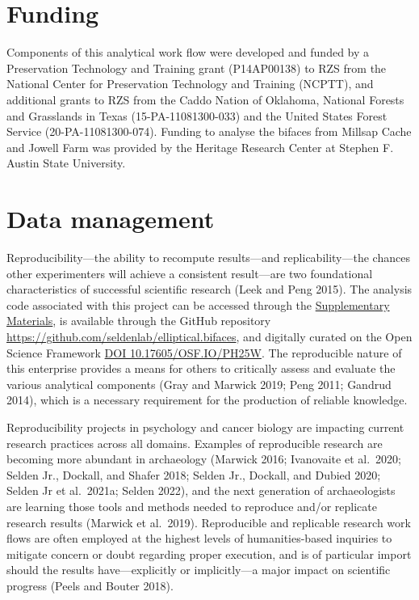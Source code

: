 \documentclass[]{interact}
\theoremstyle{plain}%
\theoremstyle{definition}
\theoremstyle{remark}
\begin{document}
\hypertarget{funding}{%
\section*{Funding}\label{funding}}

Components of this analytical work flow were developed and funded by a
Preservation Technology and Training grant (P14AP00138) to RZS from the
National Center for Preservation Technology and Training (NCPTT), and
additional grants to RZS from the Caddo Nation of Oklahoma, National
Forests and Grasslands in Texas (15-PA-11081300-033) and the United
States Forest Service (20-PA-11081300-074). Funding to analyse the
bifaces from Millsap Cache and Jowell Farm was provided by the Heritage
Research Center at Stephen F. Austin State University.

\hypertarget{data-management}{%
\section{Data management}\label{data-management}}

Reproducibility---the ability to recompute results---and
replicability---the chances other experimenters will achieve a
consistent result---are two foundational characteristics of successful
scientific research (Leek and Peng 2015). The analysis code associated
with this project can be accessed through the
\href{https://seldenlab.github.io/elliptical.bifaces/}{Supplementary
Materials}, is available through the GitHub repository
\url{https://github.com/seldenlab/elliptical.bifaces}, and digitally
curated on the Open Science Framework \href{https://osf.io/ph25w/}{DOI
10.17605/OSF.IO/PH25W}. The reproducible nature of this enterprise
provides a means for others to critically assess and evaluate the
various analytical components (Gray and Marwick 2019; Peng 2011; Gandrud
2014), which is a necessary requirement for the production of reliable
knowledge.

Reproducibility projects in psychology and cancer biology are impacting
current research practices across all domains. Examples of reproducible
research are becoming more abundant in archaeology (Marwick 2016;
Ivanovaite et al.~2020; Selden Jr., Dockall, and Shafer 2018; Selden
Jr., Dockall, and Dubied 2020; Selden Jr et al.~2021a; Selden 2022), and
the next generation of archaeologists are learning those tools and
methods needed to reproduce and/or replicate research results (Marwick
et al.~2019). Reproducible and replicable research work flows are often
employed at the highest levels of humanities-based inquiries to mitigate
concern or doubt regarding proper execution, and is of particular import
should the results have---explicitly or implicitly---a major impact on
scientific progress (Peels and Bouter 2018).






\end{document}
